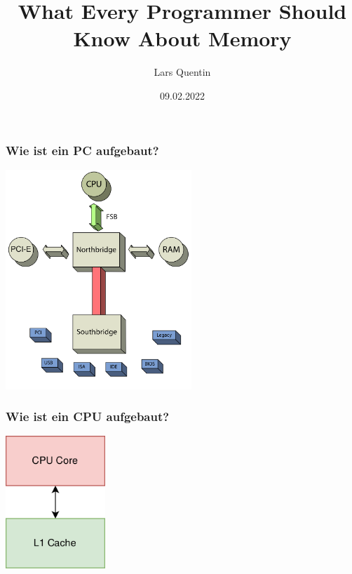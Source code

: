 \documentclass{beamer}
\title{What Every Programmer Should Know About Memory}
\author{Lars Quentin}
\date{09.02.2022}
\begin{document}
%
\begin{frame}[t]
\frametitle{Wie ist ein PC aufgebaut?}
\centering
\includegraphics[width=7cm]{architecture7.png}
\end{frame}



%
%
\begin{frame}[t]
\frametitle{Wie ist ein CPU aufgebaut?}
\centering
\includegraphics[height=5cm]{CPU2.PNG}
\end{frame}
\end{document}
